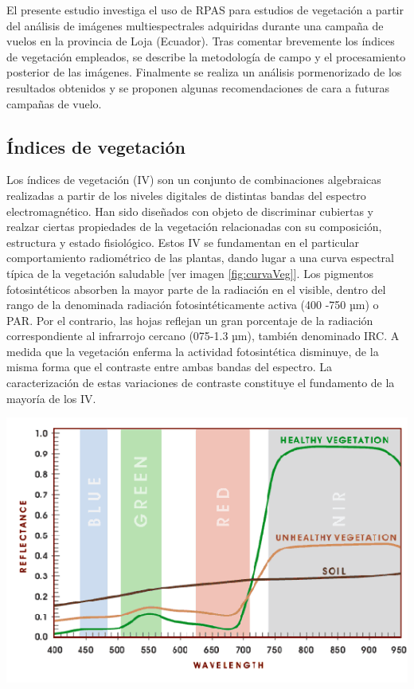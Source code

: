 \documentclass[spanish,openany]{article}
\begin{document}
El presente estudio investiga el uso de RPAS para estudios de vegetación
a partir del análisis de imágenes multiespectrales adquiridas durante
una campaña de vuelos en la provincia de Loja (Ecuador). Tras comentar
brevemente los índices de vegetación empleados, se describe la
metodología de campo y el procesamiento posterior de las imágenes.
Finalmente se realiza un análisis pormenorizado de los resultados
obtenidos y se proponen algunas recomendaciones de cara a futuras
campañas de vuelo.

\subsection{Índices de vegetación}\label{indices-de-vegetacion}

Los índices de vegetación (IV) son un conjunto de combinaciones
algebraicas realizadas a partir de los niveles digitales de distintas
bandas del espectro electromagnético. Han sido diseñados con objeto de
discriminar cubiertas y realzar ciertas propiedades de la vegetación
relacionadas con su composición, estructura y estado fisiológico. Estos
IV se fundamentan en el particular comportamiento radiométrico de las
plantas, dando lugar a una curva espectral típica de la vegetación
saludable {[}ver imagen \ref{fig:curvaVeg}{]}. Los pigmentos
fotosintéticos absorben la mayor parte de la radiación en el visible,
dentro del rango de la denominada radiación fotosintéticamente activa
(400 -750 µm) o PAR. Por el contrario, las hojas reflejan un gran
porcentaje de la radiación correspondiente al infrarrojo cercano
(075-1.3 µm), también denominado IRC. A medida que la vegetación enferma
la actividad fotosintética disminuye, de la misma forma que el contraste
entre ambas bandas del espectro. La caracterización de estas variaciones
de contraste constituye el fundamento de la mayoría de los IV.

\begin{center}\includegraphics[width=1\linewidth]{figures/veg} \end{center}
\end{document}
